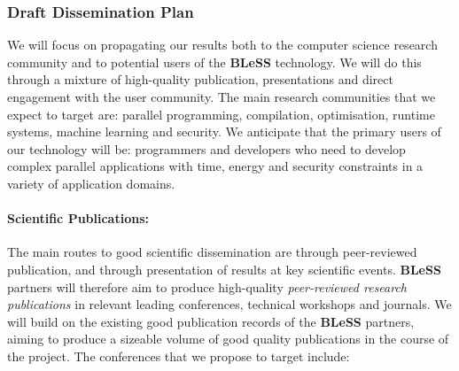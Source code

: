 \documentclass[a4paper,11pt]{article}
\newcommand{\project}[1]{\textbf{#1}\xspace}
\newcommand{\BLESS}{\project{BLeSS}}
\newcommand{\TheProject}{\BLESS}
\begin{document}

\subsubsection{Draft Dissemination Plan}

We will focus on propagating our results both to the computer science
research community and to potential users of the \TheProject{} technology.
We will do this through a mixture of high-quality publication, presentations
and direct engagement with the user community.
%
The main research communities that we expect to target are:
parallel programming, compilation, optimisation, runtime systems, machine learning and security.
%
We anticipate that the primary users of our technology will be:
programmers and developers who need to develop complex parallel applications with time, energy
and security constraints in a variety of application domains.

\paragraph{Scientific Publications:}  The main routes to good scientific dissemination are
through peer-reviewed publication, and through presentation of results at key scientific events.
\TheProject{} partners will therefore aim to produce high-quality \emph{peer-reviewed
research publications} in relevant leading
conferences, technical workshops and journals.
We will build on the existing good publication records of the \TheProject{} partners,
aiming to produce a sizeable volume of good quality publications in the course of the project. 
%
\noindent
The conferences that we propose to target include:
\end{document}
